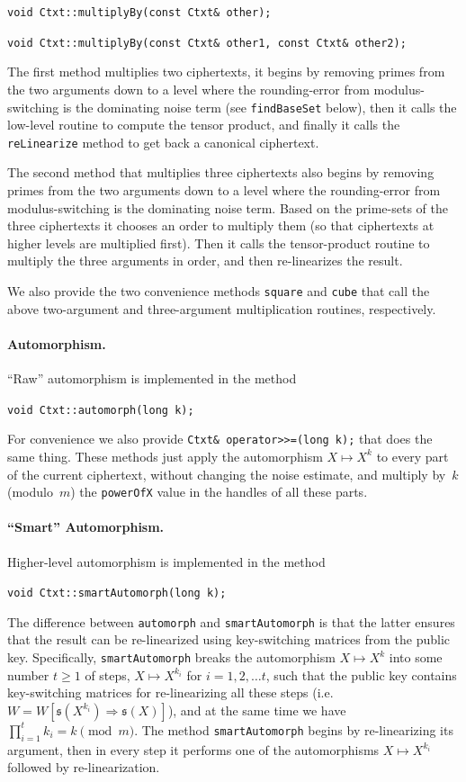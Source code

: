 \documentclass[14pt]{extarticle}
\newcommand{\sk}{\mathfrak{s}}
\begin{document}
\texttt{void Ctxt::multiplyBy(const Ctxt\& other);}

\texttt{void Ctxt::multiplyBy(const Ctxt\& other1, const Ctxt\& other2);}

\noindent
The first method multiplies two ciphertexts, it begins by removing
primes from the two arguments down to a level where the rounding-error
from modulus-switching is the dominating noise term (see
\texttt{findBaseSet} below), then it calls the
low-level routine to compute the tensor product, and finally it calls
the \texttt{reLinearize} method to get back a canonical ciphertext.

The second method that multiplies three ciphertexts also begins by
removing primes from the two arguments down to a level where the
rounding-error from modulus-switching is the dominating noise term.
Based on the prime-sets of the three ciphertexts it chooses an order
to multiply them (so that ciphertexts at higher levels are multiplied
first). Then it calls the tensor-product routine to multiply the
three arguments in order, and then re-linearizes the result.

We also provide the two convenience methods \texttt{square} and
\texttt{cube} that call the above two-argument and three-argument
multiplication routines, respectively.

\paragraph{Automorphism.} ``Raw'' automorphism is implemented in the
method

\texttt{void Ctxt::automorph(long k);}

\noindent
For convenience we also provide \texttt{Ctxt\& operator>>=(long k);}
that does the same thing.
These methods just apply the automorphism $X\mapsto X^k$ to every part
of the current ciphertext, without changing the noise estimate, and
multiply by~$k$ (modulo~$m$) the \texttt{powerOfX} value in the
handles of all these parts. 

\paragraph{``Smart'' Automorphism.} Higher-level automorphism
is implemented in the method

\texttt{void Ctxt::smartAutomorph(long k);}

\noindent
The difference between \texttt{automorph} and \texttt{smartAutomorph}
is that the latter ensures that the result can be re-linearized using
key-switching matrices from the public key. Specifically,
\texttt{smartAutomorph} breaks the automorphism $X\mapsto X^k$ into
some number $t\ge 1$ of steps, $X\mapsto X^{k_i}$ for $i=1,2,\ldots
t$, such that the public key contains key-switching matrices for
re-linearizing all these steps (i.e. $W=W[\sk(X^{k_i})\Rightarrow
\sk(X)]$), and at the same time we have $\prod_{i=1}^t k_i= k
\pmod{m}$. The method \texttt{smartAutomorph} begins by
re-linearizing its argument, then in every step it performs one of
the automorphisms $X\mapsto X^{k_i}$ followed by re-linearization.
\end{document}
